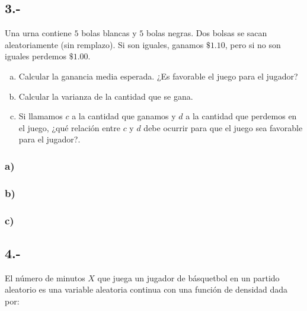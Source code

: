 \documentclass{article}
\begin{document}
\subsection*{3.-}
Una urna contiene $5$ bolas blancas y $5$ bolas negras. Dos bolsas se sacan aleatoriamente (sin remplazo).
Si son iguales, ganamos $\$1.10$, pero si no son iguales perdemos $\$1.00$.
\begin{enumerate}[a)]
    \item Calcular la ganancia media esperada. ¿Es favorable el juego para el jugador?
    \item Calcular la varianza de la cantidad que se gana.
    \item Si llamamos $c$ a la cantidad que ganamos y $d$ a la cantidad que perdemos en el juego,
    ¿qué relación entre $c$ y $d$ debe ocurrir para que el juego sea favorable para el jugador?.
\end{enumerate}
\begin{tcolorbox}[breakable]
    \subsubsection*{a)}

    \subsubsection*{b)}

    \subsubsection*{c)}
\end{tcolorbox}

\subsection*{4.-}
El número de minutos $X$ que juega un jugador de básquetbol en un partido aleatorio es una variable aleatoria continua
con una función de densidad dada por:
\end{document}

